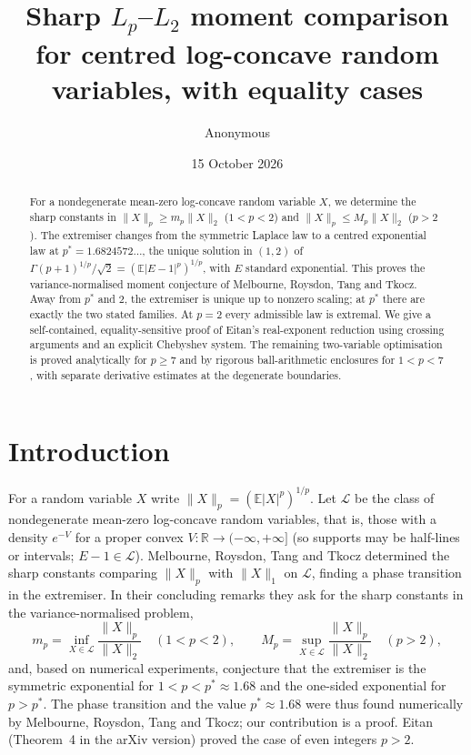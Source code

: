 \documentclass[11pt]{article}
\title{Sharp $L_p$--$L_2$ moment comparison for centred log-concave random variables, with equality cases}
\author{Anonymous}
\date{15 October 2026}
\theoremstyle{remark}
\newcommand{\E}{\mathbb E}
\begin{document}
\maketitle

\begin{abstract}
For a nondegenerate mean-zero log-concave random variable $X$, we determine the sharp constants in $\|X\|_p\ge m_p\|X\|_2$ ($1<p<2$) and $\|X\|_p\le M_p\|X\|_2$ ($p>2$). The extremiser changes from the symmetric Laplace law to a centred exponential law at $p^*=1.6824572\ldots$, the unique solution in $(1,2)$ of $\Gamma(p+1)^{1/p}/\sqrt2=(\E|E-1|^p)^{1/p}$, with $E$ standard exponential. This proves the variance-normalised moment conjecture of Melbourne, Roysdon, Tang and Tkocz. Away from $p^*$ and $2$, the extremiser is unique up to nonzero scaling; at $p^*$ there are exactly the two stated families. At $p=2$ every admissible law is extremal. We give a self-contained, equality-sensitive proof of Eitan's real-exponent reduction using crossing arguments and an explicit Chebyshev system. The remaining two-variable optimisation is proved analytically for $p\ge7$ and by rigorous ball-arithmetic enclosures for $1<p<7$, with separate derivative estimates at the degenerate boundaries.
\end{abstract}

\section{Introduction}
For a random variable $X$ write $\|X\|_p=(\E|X|^p)^{1/p}$. Let $\mathcal L$ be the class of nondegenerate mean-zero log-concave random variables, that is, those with a density $e^{-V}$ for a proper convex $V:\mathbb R\to(-\infty,+\infty]$ (so supports may be half-lines or intervals; $E-1\in\mathcal L$). Melbourne, Roysdon, Tang and Tkocz \cite{MRTT} determined the sharp constants comparing $\|X\|_p$ with $\|X\|_1$ on $\mathcal L$, finding a phase transition in the extremiser. In their concluding remarks \cite[Sec.~3.1]{MRTT} they ask for the sharp constants in the variance-normalised problem,
\[
m_p=\inf_{X\in\mathcal L}\frac{\|X\|_p}{\|X\|_2}\quad(1<p<2),\qquad
M_p=\sup_{X\in\mathcal L}\frac{\|X\|_p}{\|X\|_2}\quad(p>2),
\]
and, based on numerical experiments, conjecture that the extremiser is the symmetric exponential for $1<p<p^*\approx1.68$ and the one-sided exponential for $p>p^*$. The phase transition and the value $p^*\approx1.68$ were thus found numerically by Melbourne, Roysdon, Tang and Tkocz; our contribution is a proof. Eitan \cite[Theorem~1.4]{Eitan} (Theorem~4 in the arXiv version) proved the case of even integers $p>2$.
\end{document}
